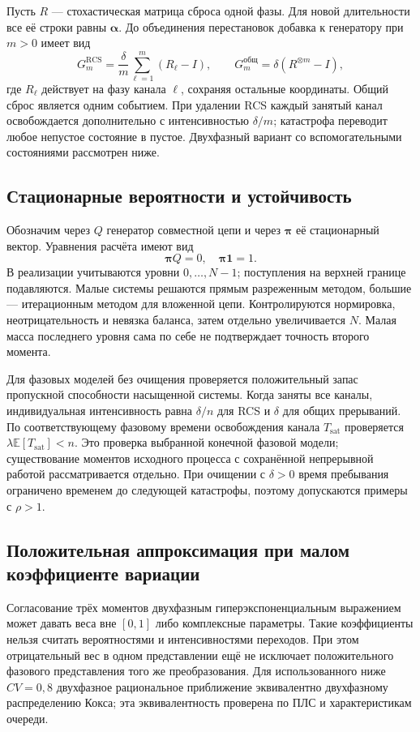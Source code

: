 \documentclass[a4paper,12pt]{article}
\begin{document}
Пусть \(R\) --- стохастическая матрица сброса одной фазы. Для новой длительности все её строки равны \(\boldsymbol\alpha\). До объединения перестановок добавка к генератору при \(m>0\) имеет вид
\[
G_m^{\mathrm{RCS}}=\frac{\delta}{m}\sum_{\ell=1}^{m}(R_\ell-I),\qquad
G_m^{\text{общ}}=\delta(R^{\otimes m}-I),
\]
где \(R_\ell\) действует на фазу канала \(\ell\), сохраняя остальные координаты. Общий сброс является одним событием. При удалении RCS каждый занятый канал освобождается дополнительно с интенсивностью \(\delta/m\); катастрофа переводит любое непустое состояние в пустое. Двухфазный вариант со вспомогательными состояниями рассмотрен ниже.

\subsection{Стационарные вероятности и устойчивость}
Обозначим через \(Q\) генератор совместной цепи и через \(\boldsymbol\pi\) её стационарный вектор. Уравнения расчёта имеют вид
\[
\boldsymbol\pi Q=0,\quad \boldsymbol\pi\mathbf1=1.
\]
В реализации учитываются уровни \(0,\ldots,N-1\); поступления на верхней границе подавляются. Малые системы решаются прямым разреженным методом, большие --- итерационным методом для вложенной цепи. Контролируются нормировка, неотрицательность и невязка баланса, затем отдельно увеличивается \(N\). Малая масса последнего уровня сама по себе не подтверждает точность второго момента.

Для фазовых моделей без очищения проверяется положительный запас пропускной способности насыщенной системы. Когда заняты все каналы, индивидуальная интенсивность равна \(\delta/n\) для RCS и \(\delta\) для общих прерываний. По соответствующему фазовому времени освобождения канала \(T_{\mathrm{sat}}\) проверяется \(\lambda\mathbb E[T_{\mathrm{sat}}]<n\). Это проверка выбранной конечной фазовой модели; существование моментов исходного процесса с сохранённой непрерывной работой рассматривается отдельно. При очищении с \(\delta>0\) время пребывания ограничено временем до следующей катастрофы, поэтому допускаются примеры с \(\rho>1\).

\subsection{Положительная аппроксимация при малом коэффициенте вариации}
Согласование трёх моментов двухфазным гиперэкспоненциальным выражением может давать веса вне \([0,1]\) либо комплексные параметры. Такие коэффициенты нельзя считать вероятностями и интенсивностями переходов. При этом отрицательный вес в одном представлении ещё не исключает положительного фазового представления того же преобразования. Для использованного ниже \(CV=0{,}8\) двухфазное рациональное приближение эквивалентно двухфазному распределению Кокса; эта эквивалентность проверена по ПЛС и характеристикам очереди.
\end{document}
